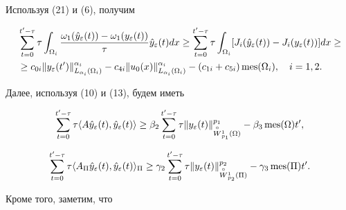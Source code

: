 \begin{pf}
\begin{equation}
\end{equation} 


Используя (21) и (6), получим


\begin{align} 


&\sum^{t'-\tau}_{t=0}\tau\int_{\Omega_i} 


\frac{\omega_1(\Hat y_\varepsilon(t))-\omega_1(y_\varepsilon(t))} 


{\tau} \Hat y_\varepsilon(t)dx \ge


\sum^{t'-\tau}_{t=0}\tau\int_{\Omega_i}[J_i(\Hat y_\varepsilon(t))- 


J_i(y_\varepsilon(t))]dx \ge\notag\\ 


&\ge c_{0i}\|y_\varepsilon(t')\|^{\alpha_i}_{L_{\alpha_i}(\Omega_i)}- 


c_{4i}\|u_0(x)\|^{\alpha_i}_{L_{\alpha_i}(\Omega_i)}- 


(c_{1i}+c_{5i})\mes(\Omega_i), \quad i=1,2. 


\end{align} 


% 


Далее, используя (10) и (13), будем иметь 


\begin{equation} 


\sum^{t'-\tau}_{t=0}\tau\langle A \Hat y_\varepsilon(t), 


\Hat y_\varepsilon(t)\rangle \ge 


\beta_2 \sum^{t'-\tau}_{t=0}\tau 


\|y_\varepsilon(t)\|^{p_1}_{\oc W{}^1_{p_1}(\Omega)}- 


\beta_3\mes(\Omega)t', 


\end{equation} 


% 


\begin{equation} 


\sum^{t'-\tau}_{t=0}\tau\langle A_\Pi \Hat y_\varepsilon(t), 


\Hat y_\varepsilon(t)\rangle_\Pi \ge 


\gamma_2 \sum^{t'-\tau}_{t=0}\tau 


\|y_\varepsilon(t)\|^{p_2}_{\oc W{}^1_{p_2}(\Pi)}- 


\gamma_3\mes(\Pi)t'. 


\end{equation} 


Кроме того, заметим, что 



\end{pf}
